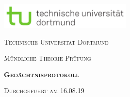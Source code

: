 



\begin{titlepage}
  \centering
  \includegraphics[width=0.5\textwidth]{pictures/tu-logo.png}\par\vspace{2cm}
  {\scshape\LARGE Technische Universität Dortmund \par}
  \vspace{1.5cm}
  {\scshape\Large Mündliche Theorie Prüfung\par}
  \vspace{1.5cm}
  {\scshape\LARGE\bfseries Gedächtnisprotokoll \par}
  \vspace{2.5cm}
  {\scshape Durchgeführt am 16.08.19 }
\end{titlepage}

\thispagestyle{empty}
\tableofcontents
\newpage



%




